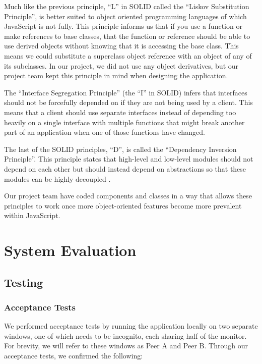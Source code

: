 Much like the previous principle, “L” in SOLID called the “Liskov Substitution Principle”, is better suited to object oriented programming languages of which JavaScript is not fully. This principle informs us that if you use a function or make references to base classes, that the function or reference should be able to use derived objects without knowing that it is  accessing the base class. This means we could substitute a superclass object reference with an object of any of its subclasses. In our project, we did not use any object derivatives, but our project team kept this principle in mind when designing the application.

The “Interface Segregation Principle” (the “I” in SOLID) infers that interfaces should not be forcefully depended on if they are not being used by a client. This means that a client should use separate interfaces instead of depending too heavily on a single interface with multiple functions that might break another part of an application when one of those functions have changed.

The last of the SOLID principles, “D”, is called the “Dependency Inversion Principle”. This principle states that high-level and low-level modules should not depend on each other but should instead depend on abstractions so that these modules can be highly decoupled \cite{singh2015effect}.

Our project team have coded components and classes in a way that allows these principles to work once more object-oriented features become more prevalent within JavaScript.

\chapter{System Evaluation}

\section{Testing}
\subsection{Acceptance Tests}
We performed acceptance tests by running the application locally on two separate windows, one of which needs to be incognito, each sharing half of the monitor. For brevity, we will refer to these windows as Peer A and Peer B. Through our acceptance tests, we confirmed the following:   

